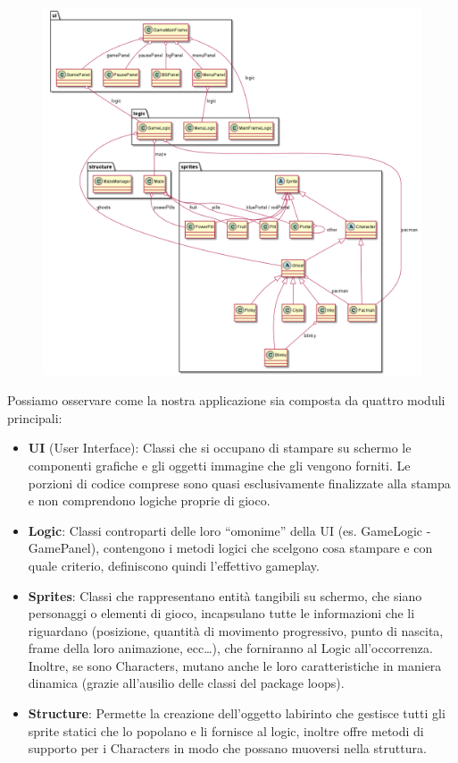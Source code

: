 \documentclass[12pt,a4paper]{report}
\begin{document}
\begin{figure}[bt]
  \includegraphics[width=.98\linewidth]{jpacman-UML}
\end{figure}

Possiamo osservare come la nostra applicazione sia composta da quattro moduli principali:
\begin{itemize}
 \item \textbf{UI} (User Interface): Classi che si occupano di stampare su schermo le componenti grafiche e gli oggetti immagine che gli vengono forniti. Le porzioni di codice comprese sono quasi esclusivamente finalizzate alla stampa e non comprendono logiche proprie di gioco.
 \item \textbf{Logic}: Classi controparti delle loro “omonime” della UI (es. GameLogic - GamePanel), contengono i metodi logici che scelgono cosa stampare e con quale criterio, definiscono quindi l’effettivo gameplay.
 \item \textbf{Sprites}: Classi che rappresentano entità tangibili su schermo, che siano personaggi o elementi di gioco, incapsulano tutte le informazioni che li riguardano (posizione, quantità di movimento progressivo, punto di nascita, frame della loro animazione, ecc…), che forniranno al Logic all’occorrenza. Inoltre, se sono Characters, mutano anche le loro caratteristiche in maniera dinamica (grazie all’ausilio delle classi del package loops).
 \item \textbf{Structure}: Permette la creazione dell’oggetto labirinto che gestisce tutti gli sprite statici che lo popolano e li fornisce al logic, inoltre offre metodi di supporto per i Characters in modo che possano muoversi nella struttura.\newpage
\end{itemize}
\end{document}
